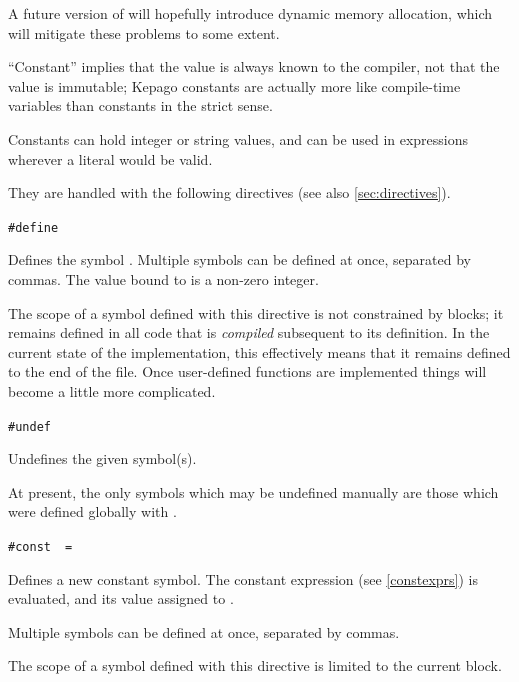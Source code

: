      A future version of \compiler{} will hopefully introduce dynamic memory
      allocation, which will mitigate these problems to some extent.


    ``Constant'' implies that the value is always known to the compiler, not
    that the value is immutable; Kepago constants are actually more like
    compile-time variables than constants in the strict sense.

    Constants can hold integer or string values, and can be used in expressions
    wherever a literal would be valid.

    They are handled with the following directives (see also \ref{sec:directives}).

    \lstinline|#define|~
    \begin{cmdesc}
      Defines the symbol .  Multiple symbols can be defined at
      once, separated by commas.  The value bound to  is
      a non-zero integer.

      The scope of a symbol defined with this directive is not constrained by
      blocks; it remains defined in all code that is \emph{compiled} subsequent
      to its definition.  In the current state of the implementation, this
      effectively means that it remains defined to the end of the file.  Once
      user-defined functions are implemented things will become a little more
      complicated.
    \end{cmdesc}

    \lstinline|#undef|~
    \begin{cmdesc}
      Undefines the given symbol(s).

      At present, the only symbols which may be undefined manually are those
      which were defined globally with .
    \end{cmdesc}

    \lstinline|#const|~~\lstinline{=}~
    \begin{cmdesc}
      Defines a new constant symbol.  The constant expression 
      (see \ref{constexprs}) is evaluated, and its value assigned to
      .

      Multiple symbols can be defined at once, separated by commas.

      The scope of a symbol defined with this directive is limited to the current
      block.
    \end{cmdesc}

